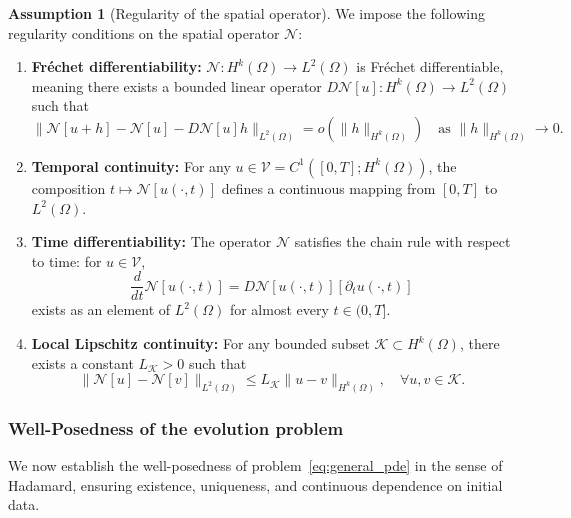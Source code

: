 \documentclass[11pt,reqno]{amsart}
\theoremstyle{plain}
\theoremstyle{definition}
\newtheorem{assumption}[theorem]{Assumption}
\theoremstyle{remark}
\begin{document}
\begin{assumption}[Regularity of the spatial operator]\label{ass:regularity}
We impose the following regularity conditions on the spatial operator $\mathcal{N}$:
\begin{enumerate}[label=(\roman*)]
    \item \textbf{Fréchet differentiability:} 
    $\mathcal{N} : H^k(\Omega) \to L^2(\Omega)$ is Fréchet differentiable, 
    meaning there exists a bounded linear operator 
    $D\mathcal{N}[u] : H^k(\Omega) \to L^2(\Omega)$ such that
    \[
    \|\mathcal{N}[u+h] - \mathcal{N}[u] - D\mathcal{N}[u]h\|_{L^2(\Omega)} 
    = o(\|h\|_{H^k(\Omega)}) 
    \quad \text{as } \|h\|_{H^k(\Omega)} \to 0.
    \]
    
    \item \textbf{Temporal continuity:} 
    For any $u \in \mathcal{V} = C^1([0,T]; H^k(\Omega))$, 
    the composition $t \mapsto \mathcal{N}[u(\cdot, t)]$ defines a continuous mapping 
    from $[0,T]$ to $L^2(\Omega)$.
    
    \item \textbf{Time differentiability:} 
    The operator $\mathcal{N}$ satisfies the chain rule with respect to time: 
    for $u \in \mathcal{V}$,
    \[
    \frac{d}{dt}\mathcal{N}[u(\cdot,t)] = D\mathcal{N}[u(\cdot,t)][\partial_t u(\cdot,t)]
    \]
    exists as an element of $L^2(\Omega)$ for almost every $t \in (0,T]$.
    
    \item \textbf{Local Lipschitz continuity:} 
    For any bounded subset $\mathcal{K} \subset H^k(\Omega)$, 
    there exists a constant $L_{\mathcal{K}} > 0$ such that
    \[
    \|\mathcal{N}[u] - \mathcal{N}[v]\|_{L^2(\Omega)} 
    \leq L_{\mathcal{K}} \|u - v\|_{H^k(\Omega)}, 
    \quad \forall u, v \in \mathcal{K}.
    \]
\end{enumerate}
\end{assumption}

\subsubsection{Well-Posedness of the evolution problem}

We now establish the well-posedness of problem~\eqref{eq:general_pde} in the sense of Hadamard, ensuring existence, uniqueness, and continuous dependence on initial data.
\end{document}
